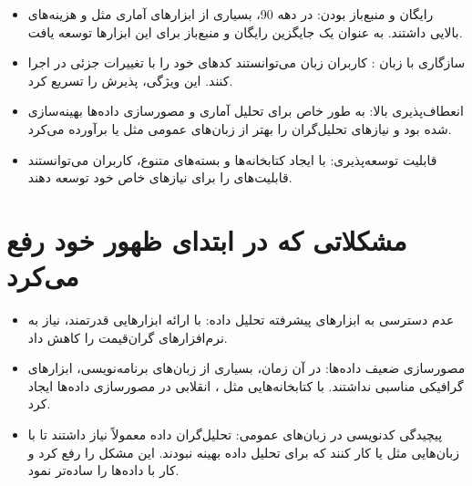 \documentclass[11pt, a4paper, oneside]{book}
\begin{document}
			\begin{itemize}
				
				\item {\large رایگان و منبع‌باز بودن}:
				{\normalsize در دهه 90، بسیاری از ابزارهای آماری مثل  و  هزینه‌های بالایی داشتند.  به عنوان یک جایگزین رایگان و منبع‌باز برای این ابزارها توسعه یافت.}
				
				\item {\large سازگاری با زبان }:
				{\normalsize کاربران زبان  می‌توانستند کدهای خود را با تغییرات جزئی در  اجرا کنند. این ویژگی، پذیرش  را تسریع کرد.}
				
				\item {\large انعطاف‌پذیری بالا}:
				{\normalsize {} به طور خاص برای تحلیل آماری و مصورسازی داده‌ها بهینه‌سازی شده بود و نیازهای تحلیل‌گران را بهتر از زبان‌های عمومی مثل  یا  برآورده می‌کرد.
				}
				
				\item {\large قابلیت توسعه‌پذیری}:
				{\normalsize با ایجاد کتابخانه‌ها و بسته‌های متنوع، کاربران می‌توانستند قابلیت‌های  را برای نیازهای خاص خود توسعه دهند.}
				
			\end{itemize}
			
		
		\section{مشکلاتی که در ابتدای ظهور خود رفع می‌کرد}
		
			\begin{itemize}
				
				\item {\large عدم دسترسی به ابزارهای پیشرفته تحلیل داده}:
				{\normalsize با ارائه ابزارهایی قدرتمند، نیاز به نرم‌افزارهای گران‌قیمت را کاهش داد.}
				
				\item {\large مصورسازی ضعیف داده‌ها}:
				{\normalsize در آن زمان، بسیاری از زبان‌های برنامه‌نویسی، ابزارهای گرافیکی مناسبی نداشتند.  با کتابخانه‌هایی مثل ، انقلابی در مصورسازی داده‌ها ایجاد کرد.}
				
				\item {\large پیچیدگی کدنویسی در زبان‌های عمومی}:
				{\normalsize تحلیل‌گران داده معمولاً نیاز داشتند تا با زبان‌هایی مثل  یا  کار کنند که برای تحلیل داده بهینه نبودند.  این مشکل را رفع کرد و کار با داده‌ها را ساده‌تر نمود.}
				
			\end{itemize}
			
\end{document}
